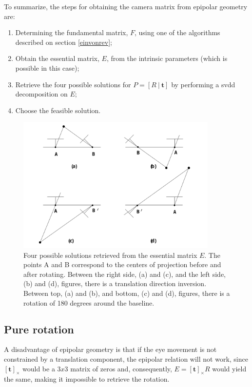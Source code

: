 To summarize, the steps for obtaining the camera matrix from epipolar geometry are:

\begin{enumerate}
	\item Determining the fundamental matrix, $F$, using one of the algorithms described on section \ref{einvonrev};
	\item Obtain the essential matrix, $E$, from the intrinsic parameters (which is possible in this case);
	\item Retrieve the four possible solutions for $P = [R \ | \ \mathbf{t}]$ by performing a \acrshort{svdd} decomposition on $E$;
	\item Choose the feasible solution.
\end{enumerate}

\begin{figure}[ht]
	\centering
	\includegraphics[width=10cm]{images/ep4sols.png}
	\caption[Four possible solutions retrieved from $E$]{Four possible solutions retrieved from the essential matrix $E$. The points A and B correspond to the centers of projection before and after rotating. Between the right side, (a) and (c), and the left side, (b) and (d), figures, there is a translation direction inversion. Between top, (a) and (b), and bottom, (c) and (d), figures, there is a rotation of 180 degrees around the baseline. \cite{multiview}}
	\label{sec2:fig:ep4}
\end{figure}

\subsection{Pure rotation}
\label{urerrrrr}
A disadvantage of epipolar geometry is that if the eye movement is not constrained by a translation component, the epipolar relation will not work, since $[\mathbf{t}]_\times$ would be a $3x3$ matrix of zeros and, consequently, $E = [\mathbf{t}]_\times R$ would yield the same, making it impossible to retrieve the rotation.\\



